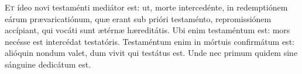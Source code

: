 
\lettrine{E}{t} ídeo novi testaménti mediátor est: ut, morte intercedénte, in redemptiónem eárum prævaricatiónum, quæ erant sub prióri testaménto, repromissiónem accípiant, qui vocáti sunt ætérnæ hæreditátis. 
Ubi enim testaméntum est: mors necésse est intercédat testatóris. 
Testaméntum enim in mórtuis confirmátum est: alióquin nondum valet, dum vivit qui testátus est. 
Unde nec primum quidem sine sánguine dedicátum est.